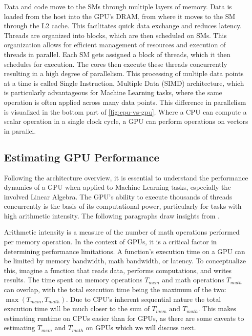Data and code move to the SMs through multiple layers of memory. Data is loaded from the host into the GPU's DRAM, from where it moves to the SM through the L2 cache. This facilitates quick data exchange and reduces latency. Threads are organized into blocks, which are then scheduled on SMs. This organization allows for efficient management of resources and execution of threads in parallel. Each SM gets assigned a block of threads, which it then schedules for execution. The cores then execute these threads concurrently resulting in a high degree of parallelism. This processing of multiple data points at a time is called Single Instruction, Multiple Data (SIMD) architecture, which is particularly advantageous for Machine Learning tasks, where the same operation is often applied across many data points. This difference in parallelism is visualized in the bottom part of \autoref{fig:cpu-vs-gpu}. Where a CPU can compute a scalar operation in a single clock cycle, a GPU can perform operations on vectors in parallel.

\subsection{Estimating GPU Performance}
\label{subsec:gpu-performance}
Following the architecture overview, it is essential to understand the performance dynamics of a GPU when applied to Machine Learning tasks, especially the involved Linear Algebra. The GPU's ability to execute thousands of threads concurrently is the basis of its computational power, particularly for tasks with high arithmetic intensity. The following paragraphs draw insights from \cite{nvidia-gpu-performance:online}.

Arithmetic intensity is a measure of the number of math operations performed per memory operation. In the context of GPUs, it is a critical factor in determining performance limitations. A function's execution time on a GPU can be limited by memory bandwidth, math bandwidth, or latency. To conceptualize this, imagine a function that reads data, performs computations, and writes results. The time spent on memory operations $ T_{mem} $ and math operations $ T_{math} $ can overlap, with the total execution time being the maximum of the two: $ \max(T_{mem}, T_{math})$. Due to CPU's inherent sequential nature the total execution time will be much closer to the sum of $T_{mem} \text{ and } T_{math}$. This makes estimating runtime on CPUs easier than for GPUs, as there are some caveats to estimating $T_{mem}$ and $T_{math}$ on GPUs which we will discuss next.

